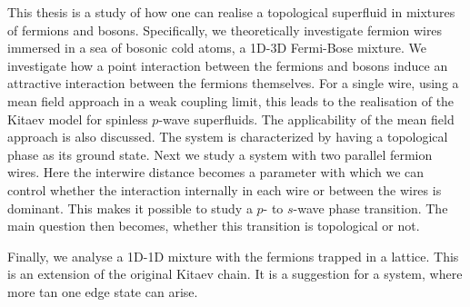 \newpage
This thesis is a study of how one can realise a topological superfluid in mixtures of fermions and bosons. Specifically, we theoretically investigate fermion wires immersed in a sea of bosonic cold atoms, a 1D-3D Fermi-Bose mixture. We investigate how a point interaction between the fermions and bosons induce an attractive interaction between the fermions themselves. For a single wire, using a mean field approach in a weak coupling limit, this leads to the realisation of the Kitaev model for spinless $p$-wave superfluids. The applicability of the mean field approach is also discussed. The system is characterized by having a topological phase as its ground state. Next we study a system with two parallel fermion wires. Here the interwire distance becomes a parameter with which we can control whether the interaction internally in each wire or between the wires is dominant. This makes it possible to study a $p$- to $s$-wave phase transition. The main question then becomes, whether this transition is topological or not. 

Finally, we analyse a 1D-1D mixture with the fermions trapped in a lattice. This is an extension of the original Kitaev chain. It is a suggestion for a system, where more tan one edge state can arise.  

